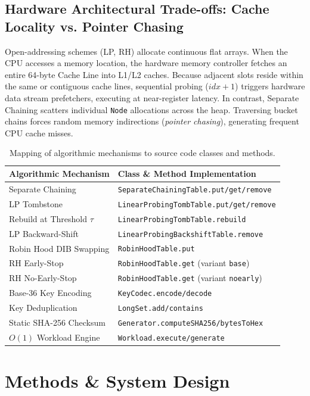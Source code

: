 \documentclass[twocolumn, 10pt, a4paper]{article}
\begin{document}
\subsection{Hardware Architectural Trade-offs: Cache Locality vs. Pointer Chasing}
Open-addressing schemes (LP, RH) allocate continuous flat arrays. When the CPU accesses a memory location, the hardware memory controller fetches an entire 64-byte Cache Line into L1/L2 caches. Because adjacent slots reside within the same or contiguous cache lines, sequential probing ($idx + 1$) triggers hardware data stream prefetchers, executing at near-register latency. In contrast, Separate Chaining scatters individual \texttt{Node} allocations across the heap. Traversing bucket chains forces random memory indirections (\textit{pointer chasing}), generating frequent CPU cache misses.

\begin{table}[htbp]
\caption{Mapping of algorithmic mechanisms to source code classes and methods.}
\label{tab:code_mapping}
\centering
\small
\begin{tabular}{ll}
\toprule
\textbf{Algorithmic Mechanism} & \textbf{Class \& Method Implementation} \\
\midrule
Separate Chaining & \texttt{SeparateChainingTable.put/get/remove} \\
LP Tombstone & \texttt{LinearProbingTombTable.put/get/remove} \\
Rebuild at Threshold $\tau$ & \texttt{LinearProbingTombTable.rebuild} \\
LP Backward-Shift & \texttt{LinearProbingBackshiftTable.remove} \\
Robin Hood DIB Swapping & \texttt{RobinHoodTable.put} \\
RH Early-Stop & \texttt{RobinHoodTable.get} (variant \texttt{base}) \\
RH No-Early-Stop & \texttt{RobinHoodTable.get} (variant \texttt{noearly}) \\
Base-36 Key Encoding & \texttt{KeyCodec.encode/decode} \\
Key Deduplication & \texttt{LongSet.add/contains} \\
Static SHA-256 Checksum & \texttt{Generator.computeSHA256/bytesToHex} \\
$O(1)$ Workload Engine & \texttt{Workload.execute/generate} \\
\bottomrule
\end{tabular}
\end{table}

\section{Methods \& System Design}
\end{document}
